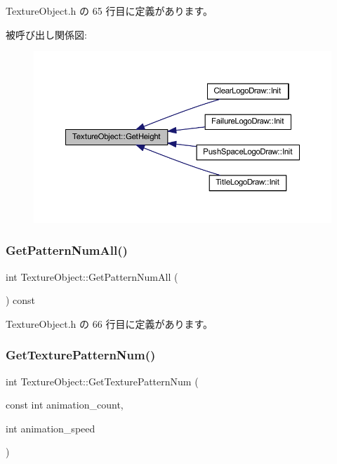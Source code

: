  Texture\+Object.\+h の 65 行目に定義があります。

被呼び出し関係図\+:\nopagebreak
\begin{figure}[H]
\begin{center}
\leavevmode
\includegraphics[width=350pt]{class_texture_object_af312bd8d8cdb31918a00e1fe096c26e0_icgraph}
\end{center}
\end{figure}
\mbox{\label{class_texture_object_a7d6efe951d81051ed4c763db1208aa40}} 
\subsubsection{\texorpdfstring{Get\+Pattern\+Num\+All()}{GetPatternNumAll()}}
{\footnotesize\ttfamily int Texture\+Object\+::\+Get\+Pattern\+Num\+All (\begin{DoxyParamCaption}{ }\end{DoxyParamCaption}) const\hspace{0.3cm}{\ttfamily [inline]}}



 Texture\+Object.\+h の 66 行目に定義があります。

\mbox{\label{class_texture_object_a5bfee4b09a77e078a51117363a6ede34}} 
\subsubsection{\texorpdfstring{Get\+Texture\+Pattern\+Num()}{GetTexturePatternNum()}}
{\footnotesize\ttfamily int Texture\+Object\+::\+Get\+Texture\+Pattern\+Num (\begin{DoxyParamCaption}\item[{const int}]{animation\+\_\+count,  }\item[{int}]{animation\+\_\+speed }\end{DoxyParamCaption})}



